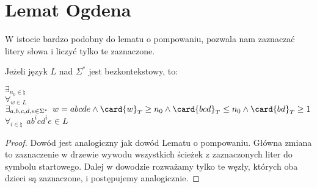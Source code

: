 \section{Lemat Ogdena}

W istocie bardzo podobny do lematu o pompowaniu, pozwala nam zaznaczać litery słowa i liczyć tylko te zaznaczone.

\begin{theorem}
    Jeżeli język \(L\) nad \(\Sigma^*\) jest bezkontekstowy, to: 
    
    \( \exists_{n_0 \in \natural} \) \\
    \( \forall_{w \in L} \) \\
    \( \exists_{a, b, c, d, e \in \Sigma^*} \hspace{5pt} w = abcde \land \card{w}_T \geq n_0 \land \card{bcd}_T \leq n_0 \land \card{bd}_T \geq 1 \) \\
    \( \forall_{i \in \natural} \hspace{5pt} ab^{i}cd^{i}e \in L\)
\end{theorem}
\begin{proof}
    Dowód jest analogiczny jak dowód Lematu o pompowaniu. Główna zmiana to zaznaczenie w drzewie wywodu wszystkich ścieżek z zaznaczonych liter do symbolu startowego. Dalej w dowodzie rozważamy tylko te węzły, których oba dzieci są zaznaczone, i postępujemy analogicznie.
\end{proof}